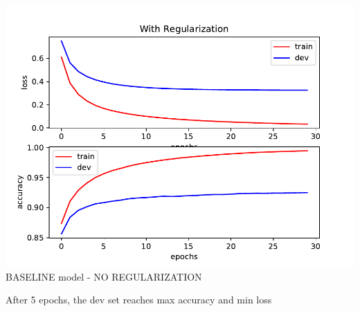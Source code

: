\begin{answer}

\centering
\includegraphics[width=6in]{baseline.pdf} 
BASELINE model - NO REGULARIZATION


After 5 epochs, the dev set reaches max accuracy and min loss
\end{answer}
   
  
